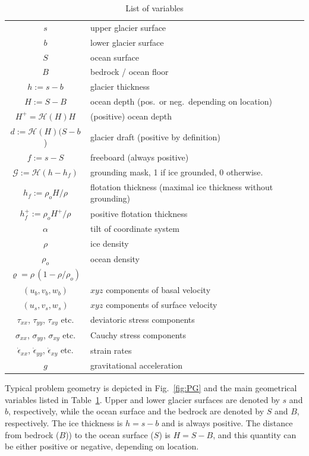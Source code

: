 \documentclass[10pt,a4paper]{book}
\newcommand{\He}{\mathcal{H}}
\newcommand{\G}{\mathcal{G}}
\newcommand{\exx}{\dot{\epsilon}_{xx}}
\newcommand{\eyy}{\dot{\epsilon}_{yy}}
\newcommand{\exy}{\dot{\epsilon}_{xy}}
\newcommand{\txx}{\tau_{xx}}
\newcommand{\tyy}{\tau_{yy}}
\newcommand{\txy}{\tau_{xy}}
\newcommand{\sxx}{\sigma_{xx}}
\newcommand{\sxy}{\sigma_{xy}}
\newcommand{\syy}{\sigma_{yy}}
\begin{document}
\begin{table}
\caption{\label{tab:geo1} List of variables}
\begin{center}
\begin{tabular}{cl}
\hline
$s$ & upper glacier surface \\
$b$ & lower glacier surface \\
$S$ & ocean surface \\
$B$ & bedrock / ocean floor \\
$h:=s-b$ & glacier thickness \\
$H:=S-B$ & ocean depth (pos.\ or neg.\ depending on location) \\
$H^{+} = \He(H) H$ & (positive) ocean depth \\
$d:=\He(H) (S-b$) & glacier draft (positive by definition) \\
$f:=s-S$ & freeboard (always positive) \\
$ \G:=\He(h-h_f)$ & grounding mask, 1 if ice grounded, 0 otherwise. \\
$h_f:=\rho_o H /\rho$ & flotation thickness (maximal ice thickness without grounding) \\
$h_f^{+}:=\rho_o H^+ /\rho$ & positive flotation thickness \\
$\alpha$                    & tilt of coordinate system\\
$\rho$ & ice density \\
$\rho_o$ & ocean density \\
$\varrho =\rho \, (1-\rho/\rho_o)$ & \\
$(u_b,v_b,w_b) $ & $xyz$ components of basal velocity \\
$(u_s,v_s,w_s) $ & $xyz$ components of surface velocity \\
$\txx$, $\tyy$, $\txy$ etc. & deviatoric stress components \\
$\sxx$, $\syy$, $\sxy$ etc. & Cauchy stress components\\
$\exx$, $\eyy$, $\exy$ etc. & strain rates \\
$g$                         & gravitational acceleration\\

\hline
\end{tabular}
\end{center}
\end{table}


Typical problem geometry is depicted in Fig.~\ref{fig:PG} and the main
geometrical variables listed in Table~\ref{tab:geo1}.  Upper and lower
glacier surfaces are denoted by $s$ and $b$, respectively, while the
ocean surface and the bedrock are denoted by $S$ and $B$,
respectively.  The ice thickness is $h=s-b$ and is always
positive. The distance from bedrock ($B$)) to the ocean surface ($S$)
is $H=S-B$, and this quantity can be either positive or negative,
depending on location.
\end{document}
